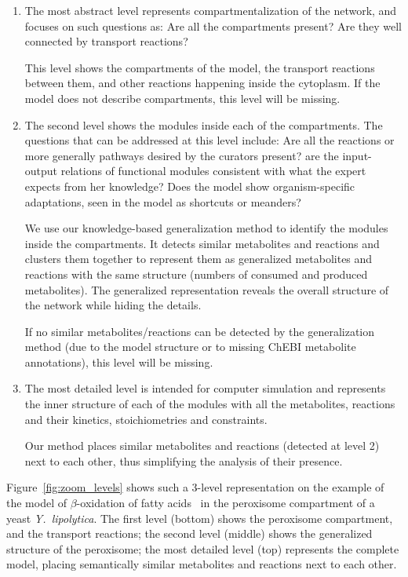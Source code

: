 \documentclass{bmcart}
\begin{document}
\begin{enumerate}
\item The most abstract level represents compartmentalization of the network, and focuses
  on such questions as: Are all the compartments present? Are they well connected by
  transport reactions? 

  This level shows the compartments of the model, the transport reactions between them,
  and other reactions happening inside the cytoplasm.  If the model does not describe
  compartments, this level will be missing.

\item The second level shows the modules inside each of the compartments. The questions
  that can be addressed at this level include: Are all the reactions or more generally pathways
  desired by the curators present? are the input-output relations of functional modules
  consistent with what the expert expects from her knowledge? Does the model show
  organism-specific adaptations, seen in the model as shortcuts or meanders?

  We use our knowledge-based generalization method to identify the modules inside the
  compartments. It detects similar metabolites and reactions and clusters them together to
  represent them as generalized metabolites and reactions with the same structure (numbers
  of consumed and produced metabolites). The generalized representation reveals the
  overall structure of the network while hiding the details.

  If no similar metabolites/reactions can be detected by the generalization method (due to
  the model structure or to missing ChEBI metabolite annotations), this level will be
  missing.

\item The most detailed level is intended for computer simulation and represents the inner
  structure of each of the modules with all the metabolites, reactions and their kinetics,
  stoichiometries and constraints.

  Our method places similar metabolites and reactions (detected at level 2) next to each
  other, thus simplifying the analysis of their presence.
\end{enumerate}
  
 Figure~\ref{fig:zoom_levels} shows such a 3-level representation on the example of the model of $\beta$-oxidation of fatty acids~\cite{Metzler01} in the peroxisome compartment of a yeast \textit{Y.~lipolytica}. The first level (bottom) shows the peroxisome compartment, and the transport reactions; the second level (middle) shows the generalized structure of the peroxisome; the most detailed level (top) represents the complete model, placing semantically similar metabolites and reactions next to each other.
\end{document}
